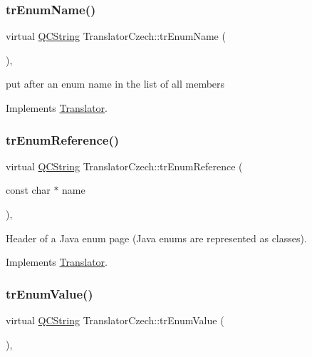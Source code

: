 \subsubsection{\texorpdfstring{trEnumName()}{trEnumName()}}
{\footnotesize\ttfamily virtual \mbox{\hyperlink{class_q_c_string}{Q\+C\+String}} Translator\+Czech\+::tr\+Enum\+Name (\begin{DoxyParamCaption}{ }\end{DoxyParamCaption})\hspace{0.3cm}{\ttfamily [inline]}, {\ttfamily [virtual]}}

put after an enum name in the list of all members 

Implements \mbox{\hyperlink{class_translator}{Translator}}.

\mbox{\label{class_translator_czech_a6622844b3e07edccd546bd063c9a5185}} 
\subsubsection{\texorpdfstring{trEnumReference()}{trEnumReference()}}
{\footnotesize\ttfamily virtual \mbox{\hyperlink{class_q_c_string}{Q\+C\+String}} Translator\+Czech\+::tr\+Enum\+Reference (\begin{DoxyParamCaption}\item[{const char $\ast$}]{name }\end{DoxyParamCaption})\hspace{0.3cm}{\ttfamily [inline]}, {\ttfamily [virtual]}}

Header of a Java enum page (Java enums are represented as classes). 

Implements \mbox{\hyperlink{class_translator}{Translator}}.

\mbox{\label{class_translator_czech_a3fe382976dcc9d4f4b11ef016e202522}} 
\subsubsection{\texorpdfstring{trEnumValue()}{trEnumValue()}}
{\footnotesize\ttfamily virtual \mbox{\hyperlink{class_q_c_string}{Q\+C\+String}} Translator\+Czech\+::tr\+Enum\+Value (\begin{DoxyParamCaption}{ }\end{DoxyParamCaption})\hspace{0.3cm}{\ttfamily [inline]}, {\ttfamily [virtual]}}

